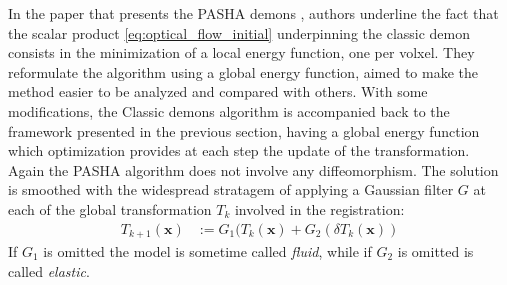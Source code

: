 In the paper that presents the PASHA demons \cite{cachier2003iconic}, authors underline the fact that the scalar product \ref{eq:optical_flow_initial} underpinning the classic demon consists in the minimization of a local energy function, one per volxel. They reformulate the algorithm using a global energy function, aimed to make the method easier to be analyzed and compared with others. With some modifications, the Classic demons algorithm is accompanied back to the framework presented in the previous section, having a global energy function which optimization provides at each step the update of the transformation. \\
%
Again the PASHA algorithm does not involve any diffeomorphism. The solution is smoothed with the widespread stratagem of applying a Gaussian filter $G$ at each of the global transformation $T_{k}$ involved in the registration:
\begin{align*}
T_{k+1}(\mathbf{x})  &:= G_{1}(T_{k}(\mathbf{x}) + G_{2}(\delta T_{k}(\mathbf{x}))
\end{align*}
If $G_{1}$ is omitted the model is sometime called \emph{fluid}, while if $G_{2}$ is omitted is called \emph{elastic}.\\

